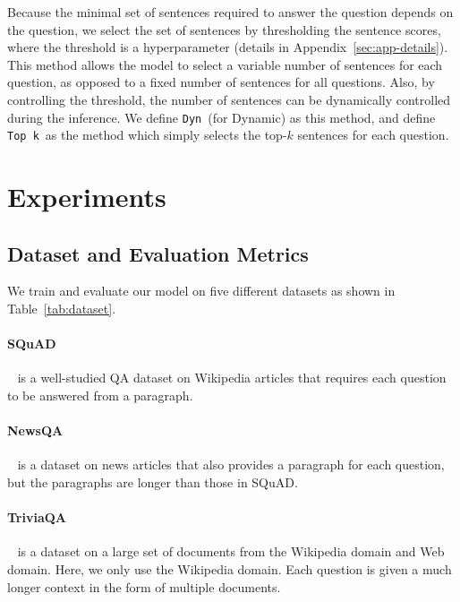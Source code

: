 \documentclass[11pt,a4paper]{article}
\newcommand{\topk}{{\tt Top k}}
\newcommand{\dyn}{{\tt Dyn}}
\begin{document}
Because the minimal set of sentences required to answer the question depends on the question, we select the set of sentences by thresholding the sentence scores, where the threshold is a hyperparameter (details in Appendix~\ref{sec:app-details}).
This method allows the model to 
select a variable number of sentences for each question, as opposed to a fixed number of sentences for all questions. Also, by controlling the threshold, the number of sentences can be dynamically controlled during the inference. We  define \dyn~(for Dynamic) as this method, and define \topk~as the method which simply selects the top-$k$ sentences for each question.


 \section{Experiments}\label{sec:exp}\subsection{Dataset and Evaluation Metrics}\label{sec:exp-dataset}
We train and evaluate our model on five different datasets as shown in Table~\ref{tab:dataset}.\\

\vspace{-.2cm}
\paragraph{SQuAD}~\cite{squad} is a well-studied QA dataset on Wikipedia articles that requires each question to be answered from a paragraph.

\vspace{-.2cm}
\paragraph{NewsQA}~\cite{newsqa} is a dataset on news articles that also provides a paragraph for each question, but the paragraphs are longer than those in SQuAD.

\vspace{-.2cm}
\paragraph{TriviaQA}~\cite{triviaqa} is a dataset on a large set of documents from the Wikipedia domain and Web domain. Here, we only use the Wikipedia domain.
Each question is given a much longer context in the form of multiple documents.
\end{document}
